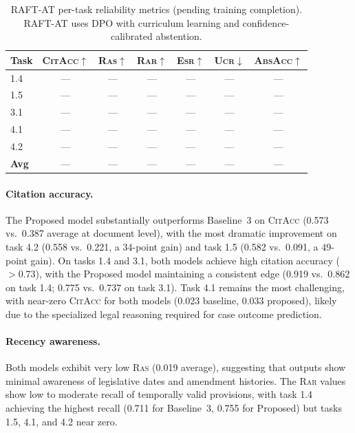 \documentclass[11pt,a4paper]{article}
\newcommand{\citacc}{\textsc{CitAcc}}
\newcommand{\ras}{\textsc{Ras}}
\newcommand{\rar}{\textsc{Rar}}
\newcommand{\esr}{\textsc{Esr}}
\newcommand{\ucr}{\textsc{Ucr}}
\newcommand{\absacc}{\textsc{AbsAcc}}
\begin{document}
\begin{table}[htbp]
\centering
\caption{RAFT-AT per-task reliability metrics (pending training completion). RAFT-AT uses DPO with curriculum learning and confidence-calibrated abstention.}
\label{tab:raft_at_results}
\begin{tabular}{@{}lcccccc@{}}
\toprule
\textbf{Task} & \textbf{\citacc}$\uparrow$ & \textbf{\ras}$\uparrow$ & \textbf{\rar}$\uparrow$ & \textbf{\esr}$\uparrow$ & \textbf{\ucr}$\downarrow$ & \textbf{\absacc}$\uparrow$ \\
\midrule
1.4 & --- & --- & --- & --- & --- & --- \\
1.5 & --- & --- & --- & --- & --- & --- \\
3.1 & --- & --- & --- & --- & --- & --- \\
4.1 & --- & --- & --- & --- & --- & --- \\
4.2 & --- & --- & --- & --- & --- & --- \\
\midrule
\textbf{Avg} & --- & --- & --- & --- & --- & --- \\
\bottomrule
\end{tabular}
\end{table}

\paragraph{Citation accuracy.}
The Proposed model substantially outperforms Baseline~3 on \citacc{} (0.573 vs.\ 0.387 average at document level), with the most dramatic improvement on task 4.2 (0.558 vs.\ 0.221, a 34-point gain) and task 1.5 (0.582 vs.\ 0.091, a 49-point gain).
On tasks 1.4 and 3.1, both models achieve high citation accuracy ($>$0.73), with the Proposed model maintaining a consistent edge (0.919 vs.\ 0.862 on task 1.4; 0.775 vs.\ 0.737 on task 3.1).
Task 4.1 remains the most challenging, with near-zero \citacc{} for both models (0.023 baseline, 0.033 proposed), likely due to the specialized legal reasoning required for case outcome prediction.

\paragraph{Recency awareness.}
Both models exhibit very low \ras{} (0.019 average), suggesting that outputs show minimal awareness of legislative dates and amendment histories.
The \rar{} values show low to moderate recall of temporally valid provisions, with task 1.4 achieving the highest recall (0.711 for Baseline~3, 0.755 for Proposed) but tasks 1.5, 4.1, and 4.2 near zero.
\end{document}
